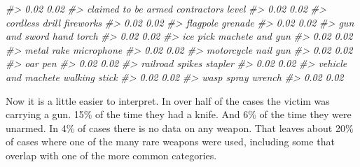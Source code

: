 \documentclass[
  12pt,
]{book}
\newenvironment{Shaded}{\begin{snugshade}}{\end{snugshade}}
\newcommand{\CommentTok}[1]{\textcolor[rgb]{0.37,0.37,0.37}{\textit{#1}}}
\begin{document}
\begin{Shaded}
\begin{Highlighting}[]
\CommentTok{\#\textgreater{}                             0.02                             0.02 }
\CommentTok{\#\textgreater{}              claimed to be armed               contractor\textquotesingle{}s level }
\CommentTok{\#\textgreater{}                             0.02                             0.02 }
\CommentTok{\#\textgreater{}                   cordless drill                        fireworks }
\CommentTok{\#\textgreater{}                             0.02                             0.02 }
\CommentTok{\#\textgreater{}                         flagpole                          grenade }
\CommentTok{\#\textgreater{}                             0.02                             0.02 }
\CommentTok{\#\textgreater{}                    gun and sword                       hand torch }
\CommentTok{\#\textgreater{}                             0.02                             0.02 }
\CommentTok{\#\textgreater{}                         ice pick                  machete and gun }
\CommentTok{\#\textgreater{}                             0.02                             0.02 }
\CommentTok{\#\textgreater{}                       metal rake                       microphone }
\CommentTok{\#\textgreater{}                             0.02                             0.02 }
\CommentTok{\#\textgreater{}                       motorcycle                         nail gun }
\CommentTok{\#\textgreater{}                             0.02                             0.02 }
\CommentTok{\#\textgreater{}                              oar                              pen }
\CommentTok{\#\textgreater{}                             0.02                             0.02 }
\CommentTok{\#\textgreater{}                  railroad spikes                          stapler }
\CommentTok{\#\textgreater{}                             0.02                             0.02 }
\CommentTok{\#\textgreater{}              vehicle and machete                    walking stick }
\CommentTok{\#\textgreater{}                             0.02                             0.02 }
\CommentTok{\#\textgreater{}                       wasp spray                           wrench }
\CommentTok{\#\textgreater{}                             0.02                             0.02}
\end{Highlighting}
\end{Shaded}

Now it is a little easier to interpret. In over half of the cases the victim was carrying a gun. 15\% of the time they had a knife. And 6\% of the time they were unarmed. In 4\% of cases there is no data on any weapon. That leaves about 20\% of cases where one of the many rare weapons were used, including some that overlap with one of the more common categories.
\end{document}
